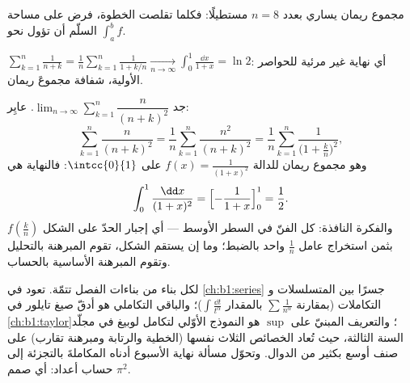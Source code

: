 \begin{omfigure}

{\small مجموع ريمان يساري بعدد $n = 8$ مستطيلًا: فكلما تقلصت
الخطوة، فرض  على مساحة السلّم أن تؤول نحو
$\int_a^b f$.}
\end{omfigure}

\begin{example}\label{ex:b1:integration:riemannexample}
$\displaystyle\sum_{k=1}^{n} \frac{1}{n + k} = \frac 1n
\sum_{k=1}^{n} \frac{1}{1 + k/n} \xrightarrow[n\to\infty]{}
\int_0^1 \frac{\dd x}{1 + x} = \ln 2$: أي نهاية غير مرئية
للحواصر الأولية، شفافة مجموعَ ريمان.
\end{example}

\begin{example}\label{ex:b1:integration:riemann2}
جد $\lim_{n\to\infty} \sum_{k=1}^{n} \dfrac{n}{(n+k)^2}$.
عايِر:
\[
\sum_{k=1}^{n} \frac{n}{(n+k)^2}
= \frac{1}{n}\sum_{k=1}^{n} \frac{n^2}{(n+k)^2}
= \frac1n \sum_{k=1}^{n} \frac{1}{\bigl(1 + \frac kn\bigr)^2} ,
\]
وهو مجموع ريمان للدالة  $f(x) = \frac{1}{(1+x)^2}$ على
$\intcc{0}{1}$: فالنهاية هي
\[
\int_0^1 \frac{\dd x}{(1 + x)^2}
= \Bigl[-\frac{1}{1+x}\Bigr]_0^1 = \frac12 .
\]
والفكرة النافذة: كل الفنّ في السطر الأوسط ---
أي إجبار الحدّ على الشكل $f(\frac kn)$ بثمن
استخراج عامل $\frac1n$ واحد بالضبط؛ وما إن يستقم الشكل،
تقوم المبرهنة بالتحليل وتقوم المبرهنة الأساسية
بالحساب.
\end{example}

\begin{remark}
لكل بناء من بناءات الفصل تتمّة. 
تعود في \cref{ch:b1:series} جسرًا بين المتسلسلات و
التكاملات (بمقارنة $\sum \frac{1}{n^\alpha}$ بالمقدار $\int
\frac{\dd t}{t^\alpha}$)؛ والباقي التكاملي هو أدقّ
صيغ تايلور في \cref{ch:b1:taylor}؛ والتعريف
المبنيّ على $\sup$ هو النموذج الأوّلي لتكامل
لوبيغ في مجلّد السنة الثالثة، حيث تُعاد الخصائص الثلاث نفسها
(الخطية والرتابة ومبرهنة تقارب) على صنف
أوسع بكثير من الدوال. وتحوّل مسألة نهاية الأسبوع أدناه
المكاملةَ بالتجزئة إلى حساب أعداد: أي صمم
$\pi^2$.
\end{remark}

